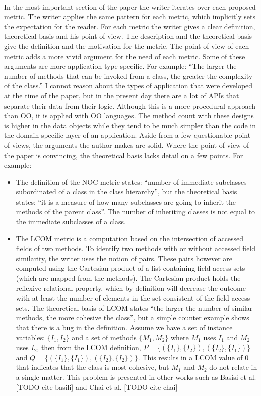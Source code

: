 \paragraph{}
In the most important section of the paper the writer iterates over each proposed metric. The writer applies the
same pattern for each metric, which implicitly sets the expectation for the reader. For each metric the writer gives a
clear definition, theoretical basis and his point of view. The description and the theoretical basis give the definition and
the motivation for the metric. The point of view of each metric adds a more vivid argument for the need of each metric.
Some of these arguments are more application-type specific. For example: ``The larger the number of methods that can be
invoked from a class, the greater the complexity of the class.'' I cannot reason about the types of application that were
developed at the time of the paper, but in the present day there are a lot of APIs that separate their data from their
logic. Although this is a more procedural approach than OO, it is applied with OO languages. The method count
with these designs is higher in the data objects while they tend to be much simpler than the code in the domain-specific
layer of an application. Aside from a few questionable point of views, the arguments the author makes are solid.
Where the point of view of the paper is convincing, the theoretical basis lacks detail on a few points. For example:

\begin{itemize}
\item
The definition of the NOC metric states: ``number of immediate subclasses subordinated of a class in the class
hierarchy'', but the theoretical basis states: ``it is a measure of how many subclasses are going to inherit
the methods of the parent class''. The number of inheriting classes is not equal to the immediate subclasses of a
class.
\item
The LCOM metric is a computation based on the intersection of accessed fields of two methods. To identify two
methods with or without accessed field similarity, the writer uses the notion of pairs. These pairs however are
computed using the Cartesian product of a list containing field access sets (which are mapped from the
methods). The Cartesian product holds the reflexive relational property, which by definition will decrease
the outcome with at least the number of elements in the set consistent of the field access sets.
The theoretical basis of LCOM states ``the larger the number of similar methods, the more cohesive the class'',
but a simple counter example shows that there is a bug in the definition. Assume we have a set of instance
variables: $\{I_1, I_2\}$ and a set of methods $\{M_1, M_2\}$ where $M_1$ uses $I_1$ and $M_2$ uses $I_2$, then from
the LCOM definition, $P = \{( \{I_1\}, \{I_2\} ), ( \{I_2\}, \{I_1\} ) \}$ and
$Q = \{( \{I_1\}, \{I_1\} ), ( \{I_2\}, \{I_2\} ) \}$. This results in a LCOM value of $0$ that indicates that
the class is most cohesive, but $M_1$ and $M_2$ do not relate in a single matter. This problem is presented in other
works such as Basisi et al. [TODO cite basili] and Chai et al. [TODO cite chai]
\end{itemize}

